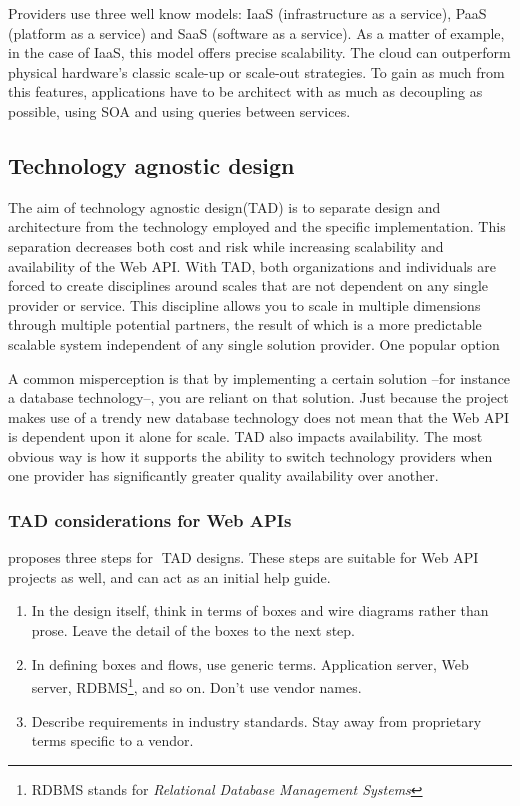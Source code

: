\documentclass[10pt,article]{IEEEtran}
\begin{document}
Providers use three well know models: IaaS (infrastructure as a service), PaaS (platform as a service) and SaaS (software as a service). As a matter of example, in the case of IaaS, this model offers precise scalability. The cloud can outperform physical hardware's classic scale-up or scale-out strategies. To gain as much from this features, applications have to be architect with as much as decoupling as possible, using SOA and using queries between services.

\subsection{Technology agnostic design}
The aim of technology agnostic design(TAD) is to separate design and architecture from the technology employed and the specific implementation. This separation decreases both cost and risk while increasing scalability and availability of the Web API.
With TAD, both organizations and individuals are forced to create disciplines around scales that are not dependent on any single provider or service. This discipline allows you to scale in multiple dimensions through multiple potential partners, the result of which is a more predictable scalable system independent of any single solution provider. One popular option 

A common misperception is that by implementing a certain solution --for instance a database technology--, you are reliant on that solution. Just because the project makes use of a trendy new database technology does not mean that the Web API is dependent upon it alone for scale. TAD also impacts availability. The most obvious way is how it supports the ability to switch technology providers when one provider has significantly greater quality availability over another.

\subsubsection{TAD considerations for Web APIs} \cite{artofscalability} proposes three steps for TAD designs. These steps are suitable for Web API projects as well, and can act as an initial help guide.

\begin{enumerate}
    \item
    In the design itself, think in terms of boxes and wire diagrams rather than prose. Leave the detail of the boxes to the next step.
    \item
    In defining boxes and flows, use generic terms. Application server, Web server, RDBMS\footnote{RDBMS stands for \textit{Relational Database Management Systems}}, and so on. Don't use vendor names.
    \item
    Describe requirements in industry standards. Stay away from proprietary terms specific to a vendor.  
\end{enumerate}
\end{document}
